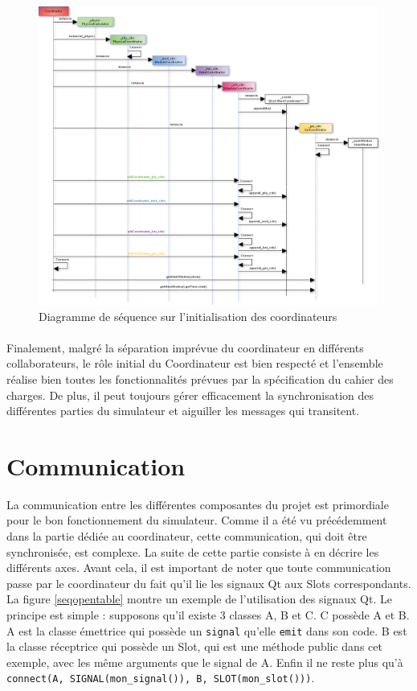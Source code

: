 \begin{figure}[!h]
\includegraphics[scale=0.4]{DiagSeqInitCoord.png}
\caption{Diagramme de séquence sur l'initialisation des coordinateurs}
\label{initcoordinators}
\end{figure}
\clearpage


\paragraph{} Finalement, malgré la séparation imprévue du coordinateur en différents collaborateurs, le rôle initial du Coordinateur est bien respecté et l'ensemble réalise bien toutes les fonctionnalités prévues par la spécification du cahier des charges. De plus, il peut toujours gérer efficacement la synchronisation des différentes parties du simulateur et aiguiller les messages qui transitent.


\section{Communication}

La communication entre les différentes composantes du projet est primordiale pour le bon fonctionnement du simulateur. Comme il a été vu précédemment dans la partie dédiée au coordinateur, cette communication, qui doit être synchronisée, est complexe. La suite de cette partie consiste à en décrire les différents axes. Avant cela, il est important de noter que toute communication passe par le coordinateur du fait qu'il lie les signaux Qt aux Slots correspondants. La figure \ref{seqopentable} montre un exemple de l'utilisation des signaux Qt. Le principe est simple : supposons qu'il existe 3 classes A, B et C. C possède A et B. A est la classe émettrice qui possède un \texttt{signal} qu'elle \texttt{emit} dans son code. B est la classe réceptrice qui possède un Slot, qui est une méthode public dans cet exemple, avec les même arguments que le signal de A. Enfin il ne reste plus qu'à \texttt{connect(A, SIGNAL(mon_signal()), B, SLOT(mon_slot()))}.  

